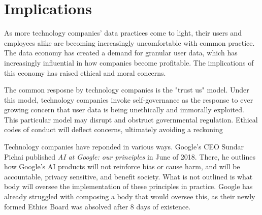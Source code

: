 \section{Implications}

As more technology companies' data practices come to light, their users and
employees alike are becoming increasingly uncomfortable with common practice.
The data economy has created a demand for granular user data, which has
increasingly influential in how companies become profitable. The implications
of this economy has raised ethical and moral concerns.


The common resposne by technology companies is the "trust us" model. Under this
model, technology companies invoke self-governance as the response to ever
growing concern that user data is being unethically and immorally exploited.
This particular model may disrupt and obstruct governmental regulation. Ethical
codes of conduct will deflect concerns, ultimately avoiding a reckoning~\cite{whittaker2018ai}

Technology companies have reponded in various ways. Google's CEO Sundar Pichai
published \textit{AI at Google: our principles} in June of 2018. There, he
outlines how Google's AI products will not reinforce bias or cause harm, and
will be accountable, privacy sensitive, and benefit society. What is not
outlined is what body will oversee the implementation of these principles in
practice. Google has already struggled with composing a body that would oversee
this, as their newly formed Ethics Board was absolved after 8 days of existence.


